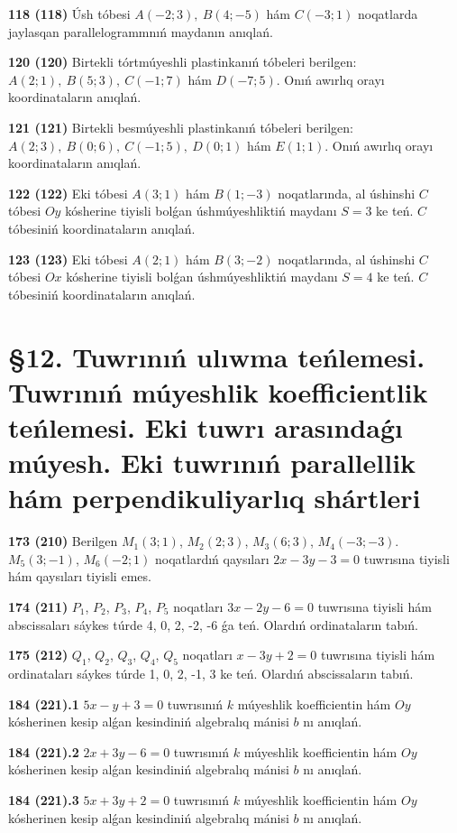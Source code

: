 \documentclass{article}
\begin{document}
\textbf{118 (118)} Úsh tóbesi $A(-2;3), \ B(4;-5)$ hám
$C(-3;1)$ noqatlarda jaylasqan parallelogrammnıń maydanın anıqlań.

\textbf{120 (120)} Birtekli tórtmúyeshli plastinkanıń tóbeleri berilgen:
$A(2;1), \ B(5;3), \ C(-1;7)$ hám $D(-7;5)$. Onıń awırlıq orayı
koordinataların anıqlań.

\textbf{121 (121)} Birtekli besmúyeshli plastinkanıń tóbeleri berilgen:
$A(2;3), \ B(0;6), \ C(-1;5), \ D(0;1)$ hám $E(1;1)$. Onıń awırlıq
orayı koordinataların anıqlań.

\textbf{122 (122)} Eki tóbesi $A(3;1)$ hám $B(1;-3)$ noqatlarında, al
úshinshi $C$ tóbesi $Oy$ kósherine tiyisli bolǵan úshmúyeshliktiń
maydanı $S=3$ ke teń. $C$ tóbesiniń koordinataların anıqlań.

\textbf{123 (123)} Eki tóbesi $A(2;1)$ hám $B(3;-2)$ noqatlarında, al
úshinshi $C$ tóbesi $Ox$ kósherine tiyisli bolǵan úshmúyeshliktiń
maydanı $S=4$ ke teń. $C$ tóbesiniń koordinataların anıqlań.

\section*{\S 12. Tuwrınıń ulıwma teńlemesi. 
Tuwrınıń múyeshlik koefficientlik teńlemesi. 
Eki tuwrı arasındaǵı múyesh. Eki tuwrınıń parallellik hám 
perpendikuliyarlıq shártleri}

\textbf{173 (210)} Berilgen $M_1 (3; 1) $, $M_2 (2; 3) $, $M_3 (6; 3) $,
$M_4 (-3;-3) $. $M_5 (3;-1) $, $M_6 (-2; 1) $ noqatlardıń qaysıları
$2x-3y-3 = 0$ tuwrısına tiyisli hám qaysıları tiyisli
emes.

\textbf{174 (211)} $P_1$, $P_2$, $P_3$, $P_4$, $P_5$  noqatları 
$3x-2y-6=0$ tuwrısına tiyisli hám abscissaları sáykes túrde 
4, 0, 2, -2, -6 ǵa teń. Olardıń ordinataların tabıń.

\textbf{175 (212)} $Q_1$, $Q_2$, $Q_3$, $Q_4$, $Q_5$ noqatları 
$x-3y+2=0$ tuwrısına tiyisli hám ordinataları sáykes túrde 
1, 0, 2, -1, 3 ke teń. Olardıń abscissaların tabıń.

\textbf{184 (221).1} $5x-y+3=0$ tuwrısınıń $k$ múyeshlik
koefficientin hám $Oy$ kósherinen kesip alǵan kesindiniń algebralıq
mánisi $b$ nı anıqlań.

\textbf{184 (221).2} $2x+3y-6=0$ tuwrısınıń $k$ múyeshlik
koefficientin hám $Oy$ kósherinen kesip alǵan kesindiniń algebralıq
mánisi $b$ nı anıqlań.

\textbf{184 (221).3} $5x+3y+2=0$ tuwrısınıń $k$ múyeshlik
koefficientin hám $Oy$ kósherinen kesip alǵan kesindiniń algebralıq
mánisi $b$ nı anıqlań.
\end{document}
